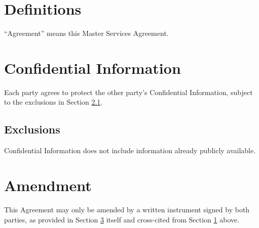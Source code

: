 \section{Definitions}\label{sec:definitions}

``Agreement'' means this Master Services Agreement.

\section{Confidential Information}\label{sec:confidential}

Each party agrees to protect the other party's Confidential Information,
subject to the exclusions in Section \ref{sec:exclusions}.

\subsection{Exclusions}\label{sec:exclusions}

Confidential Information does not include information already publicly
available.

\section{Amendment}\label{sec:amendment}

This Agreement may only be amended by a written instrument signed by
both parties, as provided in Section \ref{sec:amendment} itself and
cross-cited from Section \ref{sec:definitions} above.
